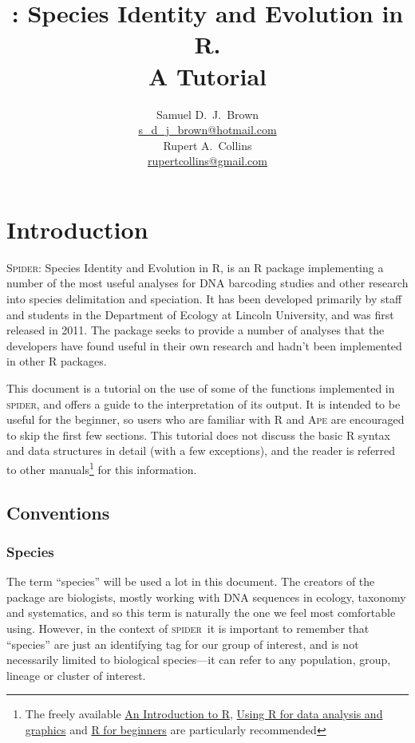 \documentclass{article}
\title{\Spider: Species Identity and Evolution in R.\\ A Tutorial}
\author{Samuel D.\ J.\ Brown\\\href{mailto:s_d_j_brown@hotmail.com}
{s\_d\_j\_brown@hotmail.com}\\Rupert A.\ Collins\\\href{mailto:rupertcollins@gmail.com}{rupertcollins@gmail.com}}
\newcommand{\spider}{\textsc{spider}} %
\newcommand{\Spider}{\textsc{Spider}} %
\newcommand{\progname}[1]{\textsc{#1}}
\begin{document}


\maketitle


\section{Introduction}
\Spider: Species Identity and Evolution in R, is an \progname{R} package implementing a number of the most useful analyses for DNA barcoding studies and other research into species delimitation and speciation. It has been developed primarily by staff and students in the Department of Ecology at Lincoln University, and was first released in 2011. The package seeks to provide a number of analyses that the developers have found useful in their own research and hadn't been implemented in other \progname{R} packages. 

This document is a tutorial on the use of some of the functions implemented in \spider, and offers a guide to the interpretation of its output. It is intended to be useful for the beginner, so users who are familiar with \progname{R} and \progname{Ape} are encouraged to skip the first few sections. This tutorial does not discuss the basic \progname{R} syntax and data structures in detail (with a few exceptions), and the reader is referred to other manuals\footnote{The freely available \href{http://cran.r-project.org/doc/manuals/R-intro.pdf}{An Introduction to R}, \href{http://cran.r-project.org/doc/contrib/usingR.pdf}{Using R for data analysis and graphics} and \href{http://cran.r-project.org/doc/contrib/Paradis-rdebuts_en.pdf}{R for beginners} are particularly recommended} for this information.

\subsection{Conventions}

\subsubsection{Species}
\label{speciesDef}
The term ``species'' will be used a lot in this document. The creators of the package are biologists, mostly working with DNA sequences in ecology, taxonomy and systematics, and so this term is naturally the one we feel most comfortable using. However, in the context of \spider~it is important to remember that ``species'' are just an identifying tag for our group of interest, and is not necessarily limited to biological species---it can refer to any population, group, lineage or cluster of interest. 
\end{document}
